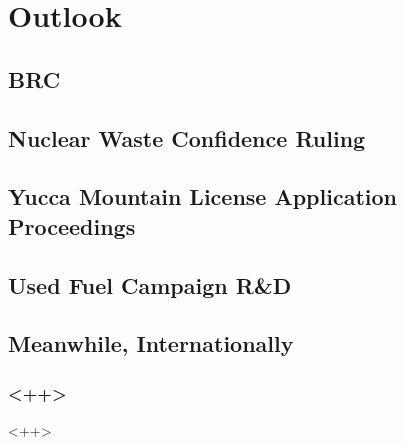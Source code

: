 \documentclass{beamer}
\begin{document}
\section{Outlook}
\subsection{BRC}

\subsection{Nuclear Waste Confidence Ruling}

\subsection{Yucca Mountain License Application Proceedings}

\subsection{Used Fuel Campaign R\&D}

\subsection{Meanwhile, Internationally}



\begin{frame}[<+ctb!+>]
  \frametitle{<++>}
\end{frame}<++>

\end{document}
